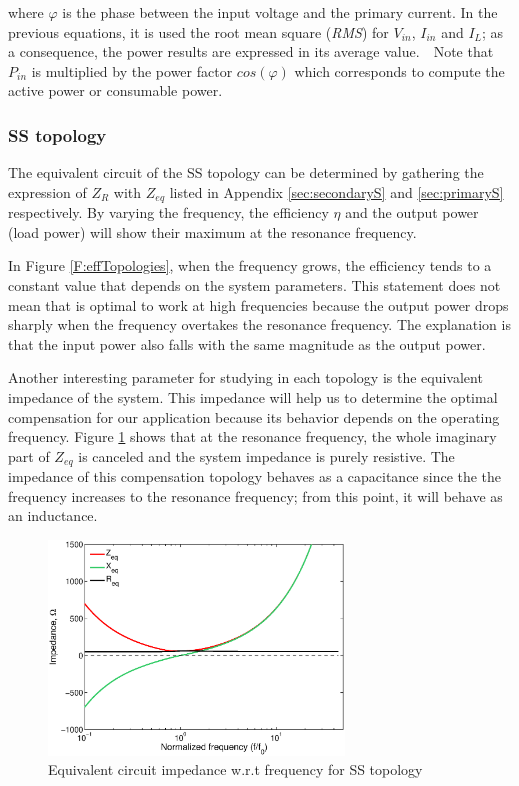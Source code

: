 where $\varphi$ is the phase between the input voltage and the primary current. In the previous equations, it is used the root mean square (\textit{RMS}) for $V_{in}$, $I_{in}$ and $I_L$; as a consequence, the power results are expressed in its average value.  Note that $P_{in}$ is multiplied by the power factor $cos(\varphi)$ which corresponds to compute the active power or consumable power.

\subsubsection{SS topology}

The equivalent circuit of the SS topology can be determined by gathering the expression of $Z_R$ with $Z_{eq}$ listed in Appendix \ref{sec:secondaryS} and \ref{sec:primaryS} respectively. By varying the frequency, the efficiency $\eta$ and the output power (load power) will show their maximum at the resonance frequency. 

In Figure \ref{F:effTopologies}, when the frequency grows, the efficiency tends to a constant value that depends on the system parameters. This statement does not mean that is optimal to work at high frequencies because the output power drops sharply when the frequency overtakes the resonance frequency. The explanation is that the input power also falls with the same magnitude as the output power.

Another interesting parameter for studying in each topology is the equivalent impedance of the system. This impedance will help us to determine the optimal compensation for our application because its behavior depends on the operating frequency. Figure \ref{F:SSimpedance} shows that at the resonance frequency, the whole imaginary part of $Z_{eq}$ is canceled and the system impedance is purely resistive. The impedance of this compensation topology behaves as a capacitance since the the frequency increases to the resonance frequency; from this point, it will behave as an inductance.


\begin{figure}[h!]
\begin{center}
\includegraphics[width=0.7\textwidth]{./images/SS_impedance} 
\caption{Equivalent circuit impedance w.r.t frequency for SS topology}
\label{F:SSimpedance}
\end{center}
\end{figure}

